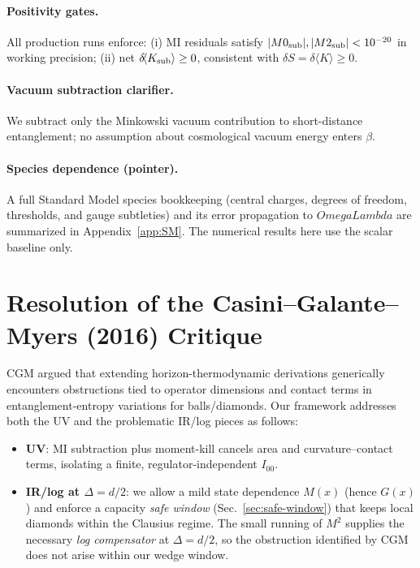 \documentclass[aps,prd,onecolumn,superscriptaddress,nofootinbib]{revtex4-2}
\def\OmL{OmegaLambda}%
\newcommand{\OmL}{\Omega_\Lambda}
\begin{document}
\paragraph*{Positivity gates.}
All production runs enforce: (i) MI residuals satisfy \(|M0_{\rm sub}|,|M2_{\rm sub}|<10^{-20}\) in working precision; (ii) net \(\delta\!\langle K_{\rm sub}\rangle \ge 0\), consistent with \(\delta S=\delta \langle K\rangle\ge 0\).

\paragraph*{Vacuum subtraction clarifier.}
We subtract only the Minkowski vacuum contribution to short-distance entanglement; no assumption about cosmological vacuum energy enters \(\beta\).

\paragraph*{Species dependence (pointer).}
A full Standard Model species bookkeeping (central charges, degrees of freedom, thresholds, and gauge subtleties) and its error propagation to \(\OmL\) are summarized in Appendix~\ref{app:SM}. The numerical results here use the scalar baseline only.

\section{Resolution of the Casini--Galante--Myers (2016) Critique}
\label{sec:CGM}
CGM argued that extending horizon-thermodynamic derivations generically encounters obstructions tied to operator dimensions and contact terms in entanglement-entropy variations for balls/diamonds. Our framework addresses both the UV and the problematic IR/log pieces as follows:
\begin{itemize}[leftmargin=1.3em]
\item \textbf{UV}: MI subtraction plus moment-kill cancels area and curvature–contact terms, isolating a finite, regulator-independent \(I_{00}\).
\item \textbf{IR/log at \(\Delta=d/2\)}: we allow a mild state dependence \(M(x)\) (hence \(G(x)\)) and enforce a capacity \emph{safe window} (Sec.~\ref{sec:safe-window}) that keeps local diamonds within the Clausius regime. The small running of \(M^2\) supplies the necessary \emph{log compensator} at \(\Delta=d/2\), so the obstruction identified by CGM does not arise within our wedge window.
\end{itemize}
\end{document}
